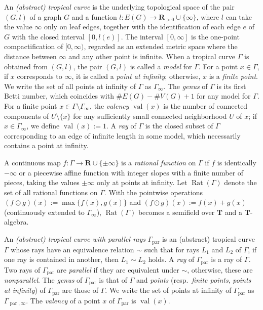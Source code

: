 \documentclass[a4paper,12pt]{amsart}
\theoremstyle{plain}
\theoremstyle{definition}
\begin{document}
An \textit{(abstract) tropical curve} is the underlying topological space of the pair $(G, l)$ of a graph $G$ and a function $l: E(G) \to {\boldsymbol{R}}_{>0} \cup \{\infty\}$, where $l$ can take the value $\infty$ only on leaf edges, together with the identification of each edge $e$ of $G$ with the closed interval $[0, l(e)]$.
The interval $[0, \infty]$ is the one-point compactification of $[0, \infty)$, regarded as an extended metric space where the distance between $\infty$ and any other point is infinite.
When a tropical curve $\varGamma$ is obtained from $(G, l)$, the pair $(G, l)$ is called a \textit{model} for $\varGamma$.
For a point $x \in \varGamma$, if $x$ corresponds to $\infty$, it is called a \textit{point at infinity}; otherwise, $x$ is a \textit{finite point}.
We write the set of all points at infinity of $\varGamma$ as $\varGamma_{\infty}$.
The \textit{genus} of $\varGamma$ is its first Betti number, which coincides with $\# E(G) - \#V(G) + 1$ for any model for $\varGamma$.
For a finite point $x \in \varGamma \setminus \varGamma_{\infty}$, the \textit{valency} $\operatorname{val}(x)$ is the number of connected components of $U \setminus \{ x \}$ for any sufficiently small connected neighborhood $U$ of $x$; if $x \in \varGamma_{\infty}$, we define $\operatorname{val}(x) := 1$.
A \textit{ray} of $\varGamma$ is the closed subset of $\varGamma$ corresponding to an edge of infinite length in some model, which necessarily contains a point at infinity.

A continuous map $f : \varGamma \to \boldsymbol{R} \cup \{ \pm \infty \}$ is a \textit{rational function} on $\varGamma$ if $f$ is identically $-\infty$ or a piecewise affine function with integer slopes with a finite number of pieces, taking the values $\pm \infty$ only at points at infinity.
Let $\operatorname{Rat}(\varGamma)$ denote the set of all rational functions on $\varGamma$.
With the pointwise operations $(f \oplus g)(x) := \max\{f(x), g(x)\}$ and $(f \odot g)(x) := f(x) + g(x)$ (continuously extended to $\varGamma_{\infty}$), $\operatorname{Rat}(\varGamma)$ becomes a semifield over $\boldsymbol{T}$ and a $\boldsymbol{T}$-algebra.

An \textit{(abstract) tropical curve with parallel rays} $\varGamma_{\operatorname{par}}$ is an (abstract) tropical curve $\varGamma$ whose rays have an equivalence relation $\sim$ such that for rays $L_1$ and $L_2$ of $\varGamma$, if one ray is contained in another, then $L_1 \sim L_2$ holds.
A \textit{ray} of $\varGamma_{\operatorname{par}}$ is a ray of $\varGamma$.
Two rays of $\varGamma_{\operatorname{par}}$ are \textit{parallel} if they are equivalent under $\sim$, otherwise, these are \textit{nonparallel}.
The \textit{genus} of $\varGamma_{\operatorname{par}}$ is that of $\varGamma$ and \textit{points} (resp.~\textit{finite points}, \textit{points at infinity}) of $\varGamma_{\operatorname{par}}$ are those of $\varGamma$.
We write the set of points at infinity of $\varGamma_{\operatorname{par}}$ as $\varGamma_{\operatorname{par}, \infty}$.
The \textit{valency} of a point $x$ of $\varGamma_{\operatorname{par}}$ is $\operatorname{val}(x)$.  
\end{document}

